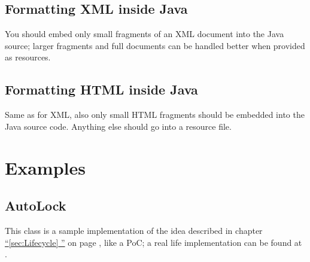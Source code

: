 \documentclass[11pt,a4paper, titlepage, parskip=half, headsepline, footsepline, cleardoublepage=current, headheight=1cm]{scrbook}
\newcommand*{\tqfullvref}[1]{\hyperref[{#1}]{“\ref*{#1} \nameref*{#1}”} on page \pageref{#1}}
\begin{document}
\subsection{Formatting XML inside Java}\label{sec:FormattingXMLInsideJava}
You should embed only small fragments of an XML document into the Java source; larger fragments and full documents can be handled better when provided as resources.

\subsection{Formatting HTML inside Java}\label{sec:FormattingHTMLInsideJava}
Same as for XML, also only small HTML fragments should be embedded into the Java source code. Anything else should go into a resource file.

\section{Examples}\label{sec:Examples}

\subsection{AutoLock}\label{sec:AutoLock}
This class is a sample implementation of the idea described in chapter \tqfullvref{sec:Lifecycle}, like a PoC; a real life implementation can be found at \autocite{TQUADRAT_ORG_FOUNDATION_AUTOLOCK}.
\end{document}
